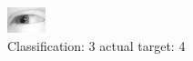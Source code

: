 \begin{figure}[h!]
\begin{center}
\includegraphics[width=0.60\columnwidth]{figures/ID2426_class_3_target_4.png}
\end{center}
\caption{ Classification: 3 actual target: 4}
\label{fig:ID2426_class_3_target_4}
\end{figure}
